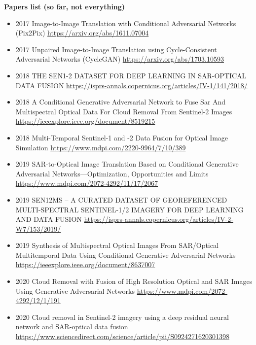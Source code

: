 \textbf{Papers list (so far, not everything)}
\begin{itemize}
    \item 2017 Image-to-Image Translation with Conditional Adversarial Networks (Pix2Pix)
    \url{https://arxiv.org/abs/1611.07004}

    \item 2017 Unpaired Image-to-Image Translation using Cycle-Consistent Adversarial Networks (CycleGAN)
    \url{https://arxiv.org/abs/1703.10593}

    \item 2018 THE SEN1-2 DATASET FOR DEEP LEARNING IN SAR-OPTICAL DATA FUSION
    \url{https://isprs-annals.copernicus.org/articles/IV-1/141/2018/}

    \item 2018 A Conditional Generative Adversarial Network to Fuse Sar And Multispectral Optical Data For Cloud Removal From Sentinel-2 Images
    \url{https://ieeexplore.ieee.org/document/8519215}

    \item 2018 Multi-Temporal Sentinel-1 and -2 Data Fusion for Optical Image Simulation
    \url{https://www.mdpi.com/2220-9964/7/10/389}

    \item 2019 SAR-to-Optical Image Translation Based on Conditional Generative Adversarial Networks—Optimization, Opportunities and Limits
    \url{https://www.mdpi.com/2072-4292/11/17/2067}

    \item 2019 SEN12MS – A CURATED DATASET OF GEOREFERENCED MULTI-SPECTRAL SENTINEL-1/2 IMAGERY FOR DEEP LEARNING AND DATA FUSION
    \url{https://isprs-annals.copernicus.org/articles/IV-2-W7/153/2019/}

    \item 2019 Synthesis of Multispectral Optical Images From SAR/Optical Multitemporal Data Using Conditional Generative Adversarial Networks
    \url{https://ieeexplore.ieee.org/document/8637007}

    \item 2020 Cloud Removal with Fusion of High Resolution Optical and SAR Images Using Generative Adversarial Networks
    \url{https://www.mdpi.com/2072-4292/12/1/191}
    
    \item 2020 Cloud removal in Sentinel-2 imagery using a deep residual neural network and SAR-optical data fusion
    \url{https://www.sciencedirect.com/science/article/pii/S0924271620301398}


\end{itemize}
